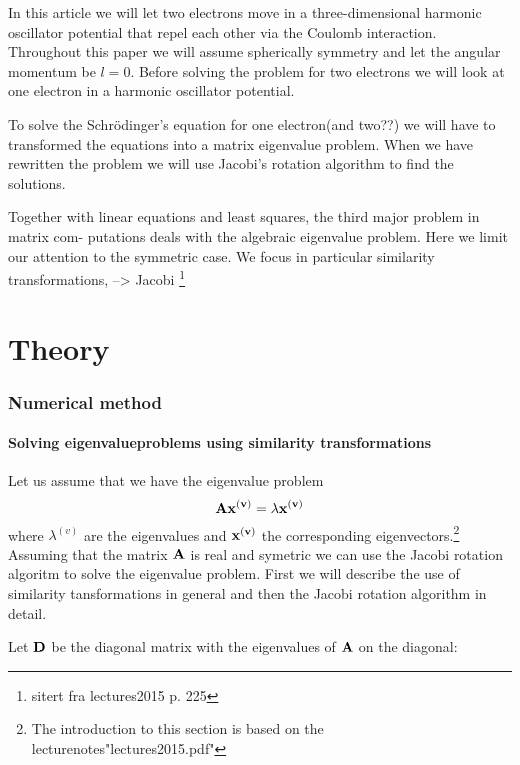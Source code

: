 \documentclass[11pt,a4wide]{article}
\begin{document}
In this article we will let two electrons move in a three-dimensional harmonic oscillator potential that repel each other via the Coulomb interaction.  Throughout this paper we will assume spherically symmetry and let the angular momentum be $l=0$. Before solving the problem for two electrons we will look at one electron in a harmonic oscillator potential. 

To solve the Schr\"odinger's equation for one electron(and two??) we will have to transformed the equations into a matrix eigenvalue problem. When we have rewritten the problem we will use Jacobi's rotation algorithm to find the solutions. %

Together with linear equations and least squares, the third major problem in matrix com- putations deals with the algebraic eigenvalue problem. Here we limit our attention to the symmetric case. We focus in particular similarity transformations, --> Jacobi \footnote{sitert fra lectures2015 p. 225}



\part{Theory}

\section{Numerical method}
\subsection{Solving eigenvalueproblems using similarity transformations}

Let us assume that we have the eigenvalue problem 
\[
\bf A \bf x^{(v)} = \lambda \bf x^{(v)}
\]
where $\lambda^{(v)}$ are the eigenvalues and $\bf x^{(v)}$ the corresponding eigenvectors.\footnote{The introduction to this section is based on the lecturenotes"lectures2015.pdf"} Assuming that the matrix $\bf A$ is real and symetric we can use the Jacobi rotation algoritm to solve the eigenvalue problem. First we will describe the use of similarity tansformations in general and then the Jacobi rotation algorithm in detail.

Let $\bf D$ be the diagonal matrix with the eigenvalues of $\bf A$ on the diagonal:
\end{document}
